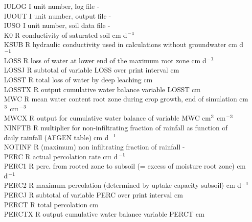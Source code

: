 \documentclass[11pt]{article}
\begin{document}
\begin{tabbing}
IULOG\> \> I\> unit number, log file\> \> \> \> \> \> \> -\\
IUOUT\> \> I\> unit number, output file\> \> \> \> \> \> \> -\\
IUSO\> \> I\> unit number, soil data file \> \> \> \> \> \> \> -\\
K0\> \> R\> conductivity of saturated soil\> \> \> \> \> \> \> cm d$^{{\rm -1}}$\\
KSUB\> \> R\> hydraulic conductivity used in calculations without groundwater\> \> \> \> \> \> \> cm d$^{{\rm -1}}$\\
LOSS\> \> R\> loss of water at lower end of the maximum root zone\> \> \> \> \> \> \> cm d$^{{\rm -1}}$\\
LOSSJ\> \> R\> subtotal of variable LOSS over print interval\> \> \> \> \> \> \> cm\\
LOSST\> \> R\> total loss of water by deep leaching\> \> \> \> \> \> \> cm\\
LOSSTX\> \> R\> output cumulative water balance variable LOSST\> \> \> \> \> \> \> cm\\
MWC\> \> R\> mean water content root zone during crop growth, end of simulation\> \> \> \> \> \> \> cm$^{{\rm 3}}$ cm$^{{\rm -3}}$\\
MWCX\> \> R\> output for cumulative water balance of variable MWC\> \> \> \> \> \> \> cm$^{{\rm 3}}$ cm$^{{\rm -3}}$\\
NINFTB\> \> R\> multiplier for non-infiltrating fraction of rainfall as function of\\
\>\> \> daily rainfall (AFGEN table)\> \> \> \> \> \> \> cm d$^{{\rm -1}}$\\
NOTINF\> \> R\> (maximum) non infiltrating fraction of rainfall\> \> \> \> \> \> \> -\\
PERC\> \> R\> actual percolation rate\> \> \> \> \> \> \> cm d$^{{\rm -1}}$\\
PERC1\> \> R\> perc. from rooted zone to subsoil (= excess of moisture root zone)\> \> \> \> \> \> \> cm d$^{{\rm -1}}$\\
PERC2\> \> R\> maximum percolation (determined by uptake capacity subsoil)\> \> \> \> \> \> \> cm d$^{{\rm -1}}$\\
PERCJ\> \> R\> subtotal of variable PERC over print interval\> \> \> \> \> \> \> cm\\
PERCT\> \> R\> total percolation\> \> \> \> \> \> \> cm\\
PERCTX\> \> R\> output cumulative water balance variable PERCT\> \> \> \> \> \> \> cm\\

\end{tabbing}
\end{document}
